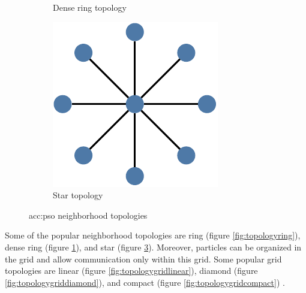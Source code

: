 \begin{figure}[t]
\begin{subfigure}[t]{0.3\textwidth}
        \caption{Dense ring topology}
        \label{fig:topologydensering}
    \end{subfigure}
    \hfill
    \begin{subfigure}[t]{0.3\textwidth}
        \includegraphics[width=\textwidth]{img/master_neigh_star.pdf}
        \caption{Star topology}
        \label{fig:topologystar}
    \end{subfigure}
    \caption{\acrshort*{acc:pso} neighborhood topologies}
\end{figure}

Some of the popular neighborhood topologies are ring (figure \ref{fig:topologyring}), dense ring (figure \ref{fig:topologydensering}), and star (figure \ref{fig:topologystar}). Moreover, particles can be organized in the grid and allow communication only within this grid. Some popular grid topologies are linear (figure \ref{fig:topologygridlinear}), diamond (figure \ref{fig:topologygriddiamond}), and compact (figure \ref{fig:topologygridcompact}) \citep{PSOtopologies}.

